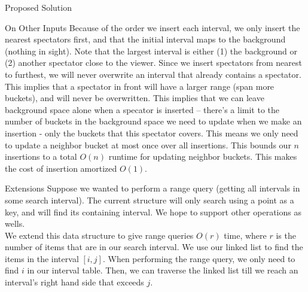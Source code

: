 \documentclass[11pt]{article}
\begin{document}
\begin{section}{Proposed Solution}
\begin{subsection}{On Other Inputs}
Because of the order we insert each interval, we only insert the nearest spectators first, and that the initial interval maps to the background (nothing in sight). 
Note that the largest interval is either (1) the background or (2) another spectator close to the viewer. Since we insert spectators from nearest to furthest, we will never overwrite an interval that already contains a spectator. This implies that a spectator in front will have a larger range (span more buckets), and will never be overwritten. This implies that we can leave background space alone when a specator is inserted -- there's a limit to the number of buckets in the background space we need to update when we make an insertion - only the buckets that this spectator covers. This means we only need to update a neighbor bucket at most once over all insertions. This bounds our $n$ insertions to a total $O(n)$ runtime for updating neighbor buckets. This makes the cost of insertion amortized $O(1)$. 

\end{subsection}
\begin{subsection}{Extensions}
Suppose we wanted to perform a range query (getting all intervals in some search interval). The current structure will only search using a point as a key, and will find its containing interval. We hope to support other operations as wells.\\

We extend this data structure to give range queries $O(r)$ time, where $r$ is the number of items that are in our search interval. We use our linked list to find the items in the interval $[i, j]$. When performing the range query, we only need to find $i$ in our interval table. Then, we can traverse the linked list till we reach an interval's right hand side that exceeds $j$. \\


\end{subsection}
\end{section}
\end{document}
